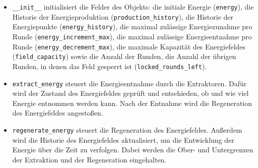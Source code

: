 \begin{itemize}
    \item \texttt{\_\_init\_\_} initialisiert die Felder des Objekts: die initiale Energie (\texttt{energy}), die Historie der Energieproduktion (\texttt{production\_history}), die Historie der Energiepunkte (\texttt{energy\_history}), die maximal zulässige Energiezunahme pro Runde (\texttt{energy\_increment\_max}), die maximal zulässige Energieentnahme pro Runde (\texttt{energy\_decrement\_max}), die maximale Kapazität des Energiefeldes (\texttt{field\_capacity}) sowie die Anzahl der Runden, die Anzahl der übrigen Runden, in denen das Feld gesperrt ist (\texttt{locked\_rounds\_left}).
    \item \texttt{extract\_energy} steuert die Energieentnahme durch die Extraktoren. Dafür wird der Zustand des Energiefeldes geprüft und entschieden, ob und wie viel Energie entnommen werden kann. Nach der Entnahme wird die Regeneration des Energiefeldes angestoßen.
    \item \texttt{regenerate\_energy} steuert die Regeneration des Energiefeldes. Außerdem wird die Historie des Energiefeldes aktualisiert, um die Entwicklung der Energie über die Zeit zu verfolgen. Dabei werden die Ober- und Untergrenzen der Extraktion und der Regeneration eingehalten.
\end{itemize}

